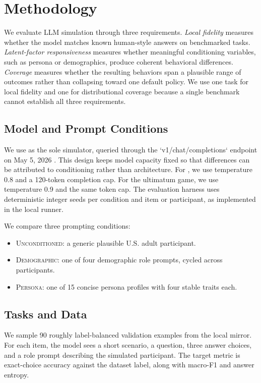 \section{Methodology}
\label{sec:methodology}

 We evaluate LLM simulation through three requirements. {\it Local fidelity} measures whether the model matches known human-style answers on benchmarked tasks. {\it Latent-factor responsiveness} measures whether meaningful conditioning variables, such as persona or demographics, produce coherent behavioral differences. {\it Coverage} measures whether the resulting behaviors span a plausible range of outcomes rather than collapsing toward one default policy. We use one task for local fidelity and one for distributional coverage because a single benchmark cannot establish all three requirements.

\subsection{Model and Prompt Conditions}

We use \gptfourone as the sole simulator, queried through the `v1/chat/completions` endpoint on May 5, 2026 \cite{openai2026gpt41}. This design keeps model capacity fixed so that differences can be attributed to conditioning rather than architecture. For \socialiqa, we use temperature 0.8 and a 120-token completion cap. For the ultimatum game, we use temperature 0.9 and the same token cap. The evaluation harness uses deterministic integer seeds per condition and item or participant, as implemented in the local runner.

We compare three prompting conditions:
\begin{itemize}
\item \textsc{Unconditioned}: a generic plausible U.S. adult participant.
\item \textsc{Demographic}: one of four demographic role prompts, cycled across participants.
\item \textsc{Persona}: one of 15 concise persona profiles with four stable traits each.
\end{itemize}

\subsection{Tasks and Data}

 We sample 90 roughly label-balanced validation examples from the local \socialiqa mirror. For each item, the model sees a short scenario, a question, three answer choices, and a role prompt describing the simulated participant. The target metric is exact-choice accuracy against the dataset label, along with macro-F1 and answer entropy.

